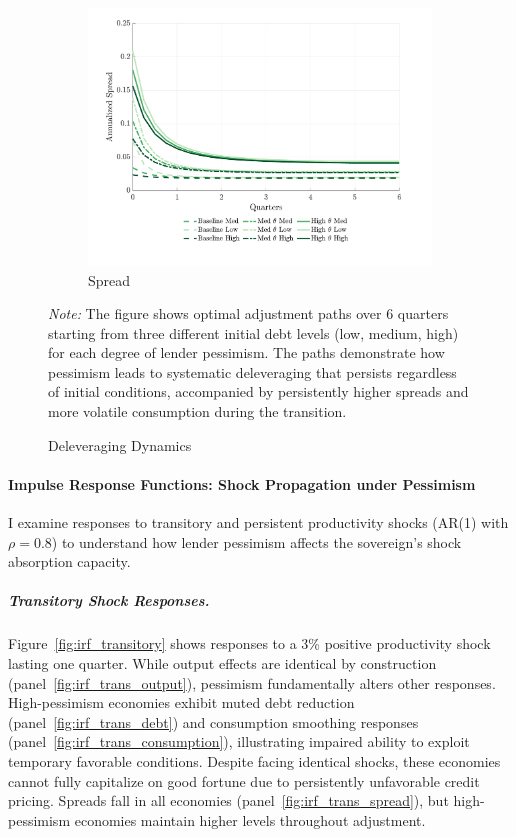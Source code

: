 \documentclass[12pt]{article}
\theoremstyle{plain}
\begin{document}
\begin{figure}[h]
\begin{subfigure}[b]{0.48\textwidth}
		\centering
		\includegraphics[width=\textwidth]{../../pessimism-default-model/results/comparison_figure_21.pdf}
		\caption{Spread}
		\label{fig:spread_path_delev}
	\end{subfigure}
	\caption{Deleveraging Dynamics}
	\label{fig:deleveraging_paths}
	\parbox{\linewidth}{\small\textit{Note:} The figure shows optimal adjustment paths over 6 quarters starting from three different initial debt levels (low, medium, high) for each degree of lender pessimism. The paths demonstrate how pessimism leads to systematic deleveraging that persists regardless of initial conditions, accompanied by persistently higher spreads and more volatile consumption during the transition.}
\end{figure}

\paragraph{Impulse Response Functions: Shock Propagation under Pessimism}

I examine responses to transitory and persistent productivity shocks (AR(1)
with $\rho = 0.8$) to understand how lender pessimism affects the sovereign's
shock absorption capacity.

\subparagraph{Transitory Shock Responses.} Figure~\ref{fig:irf_transitory} shows responses to a 3\% positive productivity
shock lasting one quarter. While output effects are identical by construction
(panel~\ref{fig:irf_trans_output}), pessimism fundamentally alters other
responses. High-pessimism economies exhibit muted debt reduction
(panel~\ref{fig:irf_trans_debt}) and consumption smoothing responses
(panel~\ref{fig:irf_trans_consumption}), illustrating impaired ability to
exploit temporary favorable conditions. Despite facing identical shocks, these
economies cannot fully capitalize on good fortune due to persistently
unfavorable credit pricing. Spreads fall in all economies
(panel~\ref{fig:irf_trans_spread}), but high-pessimism economies maintain
higher levels throughout adjustment.
\end{document}
